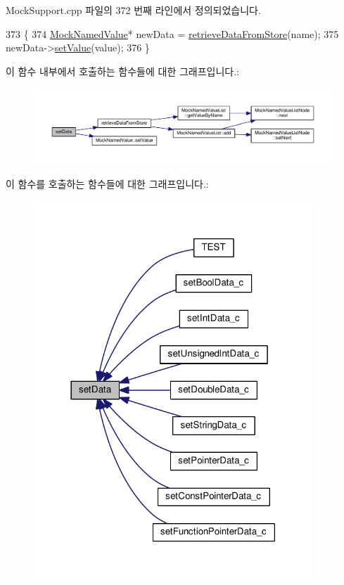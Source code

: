 Mock\+Support.\+cpp 파일의 372 번째 라인에서 정의되었습니다.


\begin{DoxyCode}
373 \{
374     \hyperlink{class_mock_named_value}{MockNamedValue}* newData = \hyperlink{class_mock_support_a768d0d8dc9e98b4ec064e01e21e14f85}{retrieveDataFromStore}(name);
375     newData->\hyperlink{class_mock_named_value_ae803b3348fa7076308d852bbdeea0d74}{setValue}(value);
376 \}
\end{DoxyCode}


이 함수 내부에서 호출하는 함수들에 대한 그래프입니다.\+:
\nopagebreak
\begin{figure}[H]
\begin{center}
\leavevmode
\includegraphics[width=350pt]{class_mock_support_ae043bf1edf89cbc67bb4701b12c55ffc_cgraph}
\end{center}
\end{figure}




이 함수를 호출하는 함수들에 대한 그래프입니다.\+:
\nopagebreak
\begin{figure}[H]
\begin{center}
\leavevmode
\includegraphics[width=297pt]{class_mock_support_ae043bf1edf89cbc67bb4701b12c55ffc_icgraph}
\end{center}
\end{figure}


